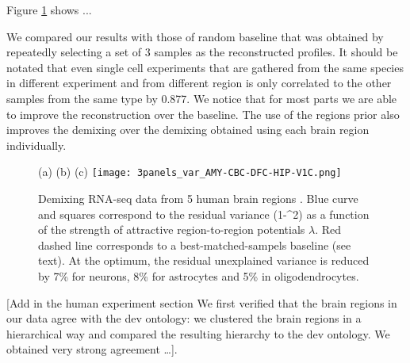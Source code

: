 Figure \ref{fig:human} shows ...


We compared our results with those of random baseline that was obtained by repeatedly selecting a set of 3 samples as the reconstructed profiles. It should be notated that even single cell experiments that are gathered from the same species in different experiment and from different region is only correlated to the other samples from the same type by 0.877. 
We notice that for most parts we are able to improve the reconstruction over the baseline. The use of the regions prior also improves the demixing over the demixing obtained using each brain region individually.





\begin{figure}[!hbt]
    \label{fig:human}
   (a) \hspace{120pt}(b) \hspace{120pt}(c) \hspace{120pt}
   \centering
     \texttt{[image: 3panels\_var\_AMY-CBC-DFC-HIP-V1C.png]}
     \caption{Demixing RNA-seq data from 5 human brain regions \cite{brainspan}. Blue curve and squares correspond to the residual variance (1-\rho^2) as a function of the strength of attractive region-to-region potentials $\lambda$. Red dashed line corresponds to a best-matched-sampels baseline (see text). At the optimum, the residual unexplained variance is reduced by 7\% for neurons, 8\% for astrocytes and 5\% in oligodendrocytes.}
    
\end{figure}



[Add in the human experiment section We first verified that the brain regions in our data agree with the dev ontology: we clustered the brain regions in a hierarchical way and compared the resulting hierarchy to the dev ontology. We obtained very strong agreement …]. 

